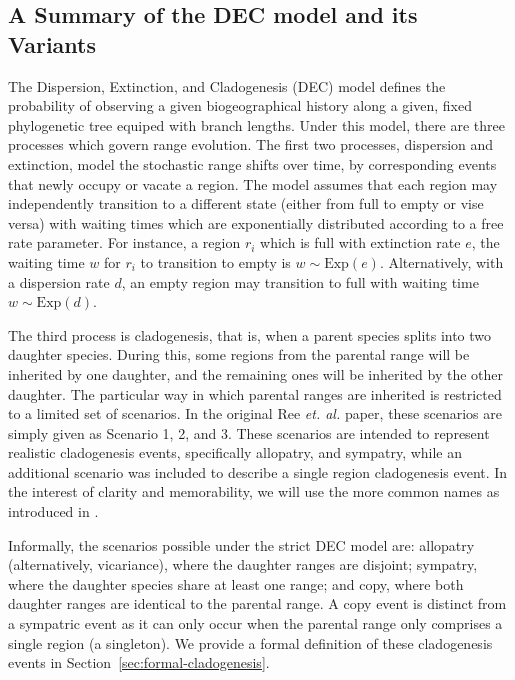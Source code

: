 \documentclass[a4paper]{article}
\begin{document}
\subsection{A Summary of the DEC model and its Variants} \label{sec:model}

The Dispersion, Extinction, and Cladogenesis (DEC) model defines the probability of observing a given biogeographical
history along a given, fixed phylogenetic tree equiped with branch lengths.
Under this model, there are three processes which govern range evolution.
The first two processes, dispersion and extinction, model the stochastic range shifts over time, by corresponding events that newly
occupy or vacate a region.
The model assumes that each region may independently transition to a different state (either from full to empty or
vise versa) with waiting times which are exponentially distributed according to a free rate parameter.
For instance, a region \( r_i \) which is full with extinction rate \( e \), the waiting time \( w \) for \( r_i \)
to transition to empty is \( w \sim \text{Exp}(e) \).
Alternatively, with a dispersion rate $d$, an empty region may transition to full with waiting time $w \sim \text{Exp}(d)$.

The third process is cladogenesis, that is, when a parent species splits into two daughter species.
During this, some regions from the parental range will be inherited by one daughter, and the remaining ones will be inherited by the
other daughter.
The particular way in which parental ranges are inherited is restricted to a limited set of scenarios.
In the original Ree \textit{et. al.}\cite{ALikelihoodFrReeR2005} paper, these scenarios are simply given as Scenario 1,
2, and 3.
These scenarios are intended to represent realistic cladogenesis events, specifically allopatry, and sympatry, while an
additional scenario was included to describe a single region cladogenesis event.
In the interest of clarity and memorability, we will use the more common names as introduced in \citet{ModelSelectionMatzke2014}.

Informally, the scenarios possible under the strict DEC model are: allopatry (alternatively, vicariance), where the
daughter ranges are disjoint; sympatry, where the daughter species share at least one range; and copy, where both
daughter ranges are identical to the parental range.
A copy event is distinct from a sympatric event as it can only occur when the parental range only comprises a single region
(a singleton).
We provide a formal definition of these cladogenesis events in Section~\ref{sec:formal-cladogenesis}.
\end{document}
